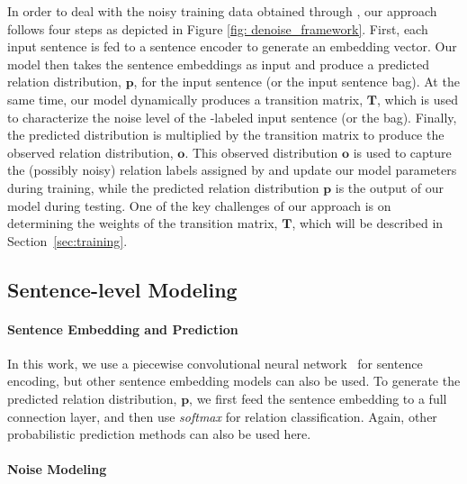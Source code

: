 In order to deal with the noisy training data obtained through \DS, our approach follows four steps as depicted in Figure \ref{fig: denoise_framework}.
First, each input sentence is fed to a sentence encoder to generate an embedding vector. Our model then takes the sentence embeddings as input and produce a predicted relation
distribution, $\mathbf{p}$, for the input sentence (or the input sentence bag). At the same time, our model dynamically produces
a transition matrix, $\mathbf{T}$, which is used to characterize the noise level of the \DS-labeled input sentence (or the
bag). Finally, the predicted distribution is multiplied by the transition matrix to produce the observed relation
distribution, $\mathbf{o}$. This observed distribution $\mathbf{o}$ is used to capture the (possibly noisy) relation labels
assigned by \DS and update our model parameters during training, while the predicted relation distribution $\mathbf{p}$ is
the output of our model during testing.
One of the key challenges of our approach is
on determining the weights of the transition matrix, $\mathbf{T}$, which will be described in Section~\ref{sec:training}.



\subsection{Sentence-level Modeling}

\paragraph{Sentence Embedding and Prediction}
 In this work, we use a piecewise convolutional neural network~\cite{zeng2015distant} for sentence encoding, but other sentence embedding models can also be used.  
To generate the predicted relation distribution, $\mathbf{p}$,  we first feed the sentence embedding to a full connection layer, and then use \emph{softmax} for
relation classification. Again, other probabilistic prediction methods can also be used here. 

\paragraph{Noise Modeling}

